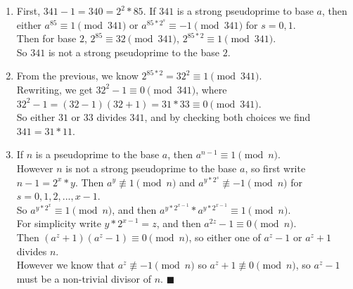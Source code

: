 \documentclass{assignment}
\begin{document}
\begin{problemlist}
\pbitem
\begin{problem}
  \begin{enumerate}
  \item
    First, $341-1 = 340 = 2^2*85$. If $341$ is a strong pseudoprime to base $a$, then either $a^{85} \equiv 1 \pmod{341}$ or $a^{85*2^s}\equiv -1\pmod{341}$ for $s=0,1$.\\
    Then for base $2$, $2^{85} \equiv 32 \pmod{341}$, $2^{85*2} \equiv 1 \pmod{341}$.\\
    So $341$ is not a strong pseudoprime to the base $2$.
  \item
    From the previous, we know $2^{85*2}=32^2 \equiv 1 \pmod{341}$.\\
    Rewriting, we get $32^2-1\equiv 0 \pmod{341}$, where $32^2-1=(32-1)(32+1)=31*33\equiv 0 \pmod{341}$.\\
    So either $31$ or $33$ divides $341$, and by checking both choices we find $341=31*11$.
  \item
    If $n$ is a pseudoprime to the base $a$, then $a^{n-1}\equiv 1 \pmod{n}$.\\
    However $n$ is not a strong pseudoprime to the base $a$, so first write $n-1=2^x*y$. Then $a^y \not\equiv 1 \pmod{n}$ and $a^{y*2^s}\not\equiv -1 \pmod{n}$ for $s=0,1,2,...,x-1$.\\
    So $a^{y*2^x} \equiv 1\pmod{n}$, and then $a^{y*2^{x-1}}*a^{y*2^{x-1}} \equiv 1 \pmod{n}$.\\
    For simplicity write $y*2^{x-1} = z$, and then $a^{2z}-1 \equiv 0 \pmod{n}$.\\
    Then $(a^z+1)(a^z-1)\equiv 0 \pmod{n}$, so either one of $a^z-1$ or $a^z+1$ divides $n$.\\
    However we know that $a^z \not\equiv -1 \pmod{n}$ so $a^z+1 \not\equiv 0 \pmod{n}$, so $a^z-1$ must be a non-trivial divisor of $n$. $\blacksquare$    
  \end{enumerate}
\end{problem}


\end{problemlist}
\end{document}
